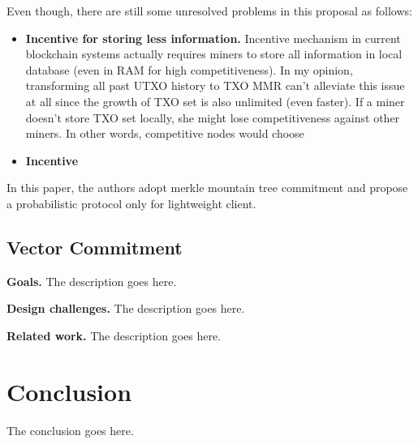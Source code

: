 \documentclass[conference]{IEEEtran}
\begin{document}
Even though, there are still some unresolved problems in this proposal as follows:

\begin{itemize}
  \item \textbf{Incentive for storing less information.} 
        Incentive mechanism in current blockchain systems actually requires miners to store all information in local database (even in RAM for high competitiveness).
        In my opinion, transforming all past UTXO history to TXO MMR can't alleviate this issue at all since the growth of TXO set is also unlimited (even faster).
        If a miner doesn't store TXO set locally, she might lose competitiveness against other miners.
        In other words, competitive nodes would choose 
  \item \textbf{Incentive}
\end{itemize}



%
In this paper\cite{luuflyclient}, the authors adopt merkle mountain tree commitment and propose a probabilistic protocol only for lightweight client.
%


\subsection{Vector Commitment}

\textbf{Goals.} The description goes here.


\textbf{Design challenges.} The description goes here.

\textbf{Related work.} The description goes here.





\section{Conclusion}

The conclusion goes here.




\end{document}
